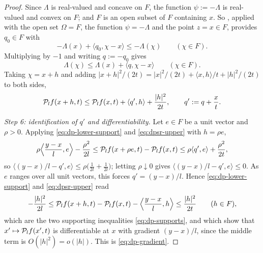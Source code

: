 \begin{proof}
Since $\Lambda$ is real-valued and concave on $F$, the function $\psi:=-\Lambda$
is real-valued and convex on $F$; and $F$ is an open subset of $F$ containing
$x$. So , applied with the open set
$\Omega=F$, the function $\psi=-\Lambda$ and the point $z=x\in F$, provides
$q_0\in F$ with
\[
  -\Lambda(x)+\langle q_0,\chi-x\rangle\le-\Lambda(\chi)\qquad(\chi\in F).
\]
Multiplying by $-1$ and writing $q:=-q_0$ gives
\[
  \Lambda(\chi)\le\Lambda(x)+\langle q,\chi-x\rangle\qquad(\chi\in F).
\]
Taking $\chi=x+h$ and adding
$|x+h|^2/(2t)=|x|^2/(2t)+\langle x,h\rangle/t+|h|^2/(2t)$ to both sides,
\begin{equation}\label{eq:dpsr-upper}
  \mathcal{P}_lf(x+h,t)\le\mathcal{P}_lf(x,t)+\langle q',h\rangle+\frac{|h|^2}{2t},
  \qquad q':=q+\frac xt .
\end{equation}

\emph{Step 6: identification of $q'$ and differentiability.}
Let $e\in F$ be a unit vector and $\rho>0$. Applying
\eqref{eq:dp-lower-support} and \eqref{eq:dpsr-upper} with $h=\rho e$,
\[
  \rho\Bigl\langle\frac{y-x}{l},e\Bigr\rangle-\frac{\rho^2}{2l}
   \le\mathcal{P}_lf(x+\rho e,t)-\mathcal{P}_lf(x,t)
   \le\rho\langle q',e\rangle+\frac{\rho^2}{2t},
\]
so $\bigl\langle(y-x)/l-q',e\bigr\rangle\le\rho\bigl(\tfrac1{2t}+\tfrac1{2l}\bigr)$;
letting $\rho\downarrow0$ gives
$\bigl\langle(y-x)/l-q',e\bigr\rangle\le0$. As $e$ ranges over all unit
vectors, this forces $q'=(y-x)/l$. Hence
\eqref{eq:dp-lower-support} and \eqref{eq:dpsr-upper} read
\[
  -\frac{|h|^2}{2l}
   \le\mathcal{P}_lf(x+h,t)-\mathcal{P}_lf(x,t)-\Bigl\langle\frac{y-x}{l},h\Bigr\rangle
   \le\frac{|h|^2}{2t}\qquad(h\in F),
\]
which are the two supporting inequalities \eqref{eq:dp-supports}, and which show
that $x'\mapsto\mathcal{P}_lf(x',t)$ is differentiable at $x$ with gradient
$(y-x)/l$, since the middle term is $O(|h|^2)=o(|h|)$. This is
\eqref{eq:dp-gradient}.
\end{proof}
